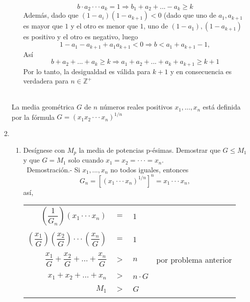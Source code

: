 \begin{enumerate}
\begin{enumerate}[C1]
$$b\cdot a_2 \cdot \cdot \cdot a_k = 1 \Rightarrow b_1 + a_2 + ... - a_k \geq k$$
Además, dado que $(1-a_i)(1-a_{k+1})<0$ (dado que uno de $a_1, a_{k+1}$ es mayor que $1$ y el otro es menor que $1$, uno de $(1-a_1), (1-a_{k+1})$ es positivo y el otro es negativo, luego $$1-a_1-a_{k+1}+a_1a_{k+1}<0 \Rightarrow b<a_1 + a_{k+1}-1,$$
Así
$$b+a_2+...+a_k\geq k \Rightarrow a_1 + a_2 +...+a_k + a_{k+1} \geq k+1$$
Por lo tanto, la desigualdad es válida para $k+1$ y en consecuencia es verdadera para $n\in \mathbb{Z}^+$\\\\
\end{enumerate}

\begin{tcolorbox}[colback = white]
\begin{def.}
La media geométrica $G$ de $n$ números reales positivos $x_1,...,x_n$ está definida por la fórmula $G=(x_1 x_2 \cdot \cdot \cdot x_n)^{1/n}$
\end{def.}
\end{tcolorbox}
\item 
\begin{enumerate}[\bfseries (a)]
\item Desígnese con $M_p$ la media de potencias p-ésimas. Demostrar que $G \leq M_1$ y que $G=M_1$ solo cuando $x_1 = x_2 = \cdot \cdot \cdot = x_n.$\\\
Demostración.- \; Si $x_1, ... ,x_n$ no todos iguales, entonces $$G_n = \left[ (x_1 \cdot \cdot \cdot x_n)^{1/n} \right]^n = x_1 \cdot \cdot \cdot x_n,$$ así, 
\begin{center}
\begin{tabular}{rcll}
$\left( \dfrac{1}{G_n} \right)(x_1\cdot \cdot \cdot x_n)$&$=$&$1$&\\\\
$\left( \dfrac{x_1}{G} \right) \left( \dfrac{x_2}{G} \right) \cdot \cdot \cdot \left( \dfrac{x_n}{G} \right)$&$=$&$1$&\\\\
$\dfrac{x_1}{G} + \dfrac{x_2}{G} + ... + \dfrac{x_n}{G}$&$>$&$n$& por problema anterior\\\\
$x_1+x_2+...+x_n$&$>$&$n \cdot G$\\\\
$M_1$&$>$&$G$\\\\
\end{tabular}
\end{center}

\end{enumerate}
\end{enumerate}
